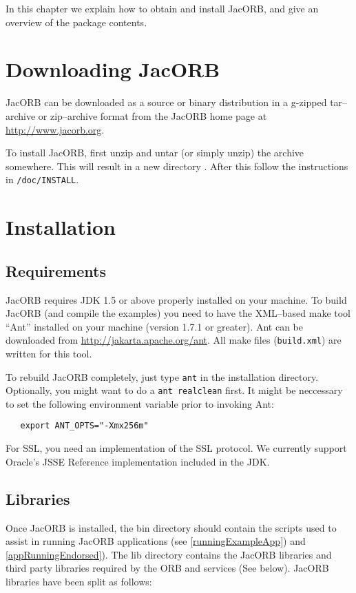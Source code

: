 
In this chapter  we explain how to obtain and  install JacORB, and give
an overview of the package contents.

\section{Downloading JacORB}


JacORB can be downloaded as a source or binary distribution in a
g-zipped tar--archive or zip--archive format from the JacORB home
page at \href{http://www.jacorb.org}{http://www.jacorb.org}.

To install JacORB, first unzip and untar (or simply unzip) the archive
somewhere.  This will result  in a new directory {\tt \JacORBDir}.
After this follow the instructions in {\tt \JacORBDir/doc/INSTALL}.

\section{Installation}
\label{Sec_installation}

\subsection{Requirements}

JacORB requires JDK 1.5 or above properly installed on your machine.  To build
JacORB (and compile the examples) you need to have the XML--based make tool
``Ant'' installed on your machine (version 1.7.1 or greater).  Ant can be downloaded
from \href{http://jakarta.apache.org/ant}{http://jakarta.apache.org/ant}. All make
files ({\tt build.xml}) are written for this tool.

To rebuild JacORB completely, just type {\tt ant} in the installation directory. Optionally,
you might want to do a {\tt ant realclean} first. It might be neccessary to set the following
environment variable prior to invoking Ant:
\small{
\begin{verbatim}
   export ANT_OPTS="-Xmx256m"
\end{verbatim}
}
For SSL, you need an implementation of the SSL protocol. We currently support
Oracle's JSSE Reference implementation included in the JDK.

\subsection{Libraries}
Once JacORB is installed, the bin directory should contain the scripts used to assist in
running JacORB applications (see \ref{runningExampleApp}) and \ref{appRunningEndorsed}).
The lib directory contains the JacORB libraries and third party libraries required by the ORB
and services (See below). JacORB libraries have been split as follows:

